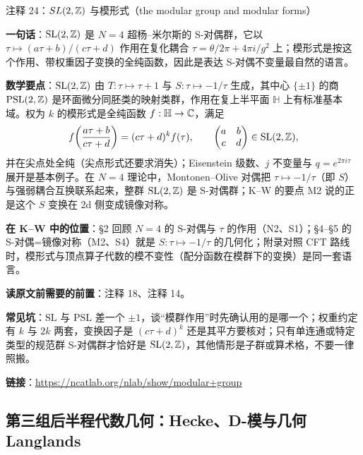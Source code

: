 \begin{kcard}{注释 24：$SL(2,\mathbb{Z})$ 与模形式（the modular group and modular forms）}

\textbf{一句话}：$\mathrm{SL}(2,\mathbb{Z})$ 是 $N=4$ 超杨--米尔斯的 S-对偶群，它以 $\tau\mapsto(a\tau+b)/(c\tau+d)$ 作用在复化耦合 $\tau=\theta/2\pi+4\pi i/g^2$ 上；模形式是按这个作用、带权重因子变换的全纯函数，因此是表达 S-对偶不变量最自然的语言。

\textbf{数学要点}：$\mathrm{SL}(2,\mathbb{Z})$ 由 $T:\tau\mapsto\tau+1$ 与 $S:\tau\mapsto-1/\tau$ 生成，其中心 $\{\pm1\}$ 的商 $\mathrm{PSL}(2,\mathbb{Z})$ 是环面微分同胚类的映射类群，作用在复上半平面 $\mathbb H$ 上有标准基本域。权为 $k$ 的模形式是全纯函数 $f:\mathbb H\to\mathbb{C}$，满足
\[
f\!\left(\frac{a\tau+b}{c\tau+d}\right)=(c\tau+d)^k f(\tau),
\qquad \begin{pmatrix}a&b\\ c&d\end{pmatrix}\in \mathrm{SL}(2,\mathbb{Z}),
\]
并在尖点处全纯（尖点形式还要求消失）；Eisenstein 级数、$j$ 不变量与 $q=e^{2\pi i\tau}$ 展开是基本例子。在 $N=4$ 理论中，Montonen--Olive 对偶把 $\tau\mapsto-1/\tau$（即 $S$）与强弱耦合互换联系起来，整群 $\mathrm{SL}(2,\mathbb{Z})$ 是 S-对偶群；K--W 的要点 M2 说的正是这个 $S$ 变换在 2d 侧变成镜像对称。

\textbf{在 K--W 中的位置}：§2 回顾 $N=4$ 的 S-对偶与 $\tau$ 的作用（N2、S1）；§4--§5 的 S-对偶=镜像对称（M2、S4）就是 $S:\tau\mapsto-1/\tau$ 的几何化；附录对照 CFT 路线时，模形式与顶点算子代数的模不变性（配分函数在模群下的变换）是同一套语言。

\textbf{读原文前需要的前置}：注释 18、注释 14。

\textbf{常见坑}：$\mathrm{SL}$ 与 $\mathrm{PSL}$ 差一个 $\pm1$，谈“模群作用”时先确认用的是哪一个；权重约定有 $k$ 与 $2k$ 两套，变换因子是 $(c\tau+d)^k$ 还是其平方要核对；只有单连通或特定类型的规范群 S-对偶群才恰好是 $\mathrm{SL}(2,\mathbb{Z})$，其他情形是子群或算术格，不要一律照搬。

\noindent\textbf{链接}：\url{https://ncatlab.org/nlab/show/modular+group}
\end{kcard}

\subsection*{第三组\quad 后半程代数几何：Hecke、D-模与几何 Langlands}

